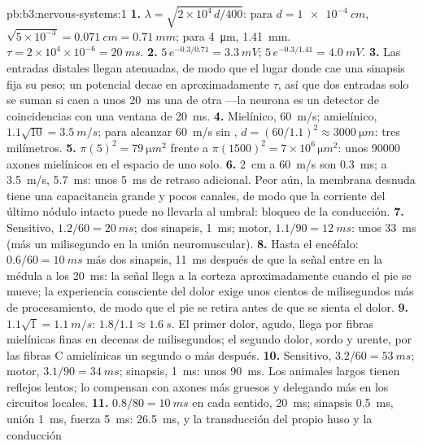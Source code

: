 \begin{solution}{pb:b3:nervous-systems:1}
\textbf{1.} $\lambda = \sqrt{2\times 10^{4}\,d/400}$: para $d =
\qty{1e-4}{cm}$, $\sqrt{5\times 10^{-3}} = \qty{0.071}{cm} =
\qty{0.71}{mm}$; para \qty{4}{\micro m}, \qty{1.41}{mm}. $\tau = 2\times
10^{4}\times 10^{-6} = \qty{20}{ms}$.
\textbf{2.} $5\,e^{-0.3/0.71} = \qty{3.3}{mV}$; $5\,e^{-0.3/1.41} =
\qty{4.0}{mV}$.
\textbf{3.} Las entradas distales llegan atenuadas, de modo que el
lugar donde cae una sinapsis fija su peso; un potencial decae en
aproximadamente $\tau$, así que dos entradas solo se suman si caen a
unos \qty{20}{ms} una de otra ---la neurona es un detector de
coincidencias con una ventana de \qty{20}{ms}.
\textbf{4.} Mielínico, \qty{60}{m/s}; amielínico, $1.1\sqrt{10} =
\qty{3.5}{m/s}$; para alcanzar \qty{60}{m/s} sin , $d = (60/1.1)^{2}
\approx \qty{3000}{\micro m}$: tres milímetros.
\textbf{5.} $\pi(5)^{2} = \qty{79}{\micro m^2}$ frente a $\pi(1500)^{2} =
7\times 10^{6}\,\unit{\micro m^2}$: unos \num{90000} axones mielínicos
en el espacio de uno solo.
\textbf{6.} \qty{2}{cm} a \qty{60}{m/s} son \qty{0.3}{ms}; a
\qty{3.5}{m/s}, \qty{5.7}{ms}: unos \qty{5}{ms} de retraso adicional.
Peor aún, la membrana desnuda tiene una capacitancia grande y pocos
canales, de modo que la corriente del último nódulo intacto puede no
llevarla al umbral: bloqueo de la conducción.
\textbf{7.} Sensitivo, $1.2/60 = \qty{20}{ms}$; dos sinapsis,
\qty{1}{ms}; motor, $1.1/90 = \qty{12}{ms}$: unos \qty{33}{ms} (más un
milisegundo en la unión neuromuscular).
\textbf{8.} Hasta el encéfalo: $0.6/60 = \qty{10}{ms}$ más dos
sinapsis, \qty{11}{ms} después de que la señal entre en la médula a los
\qty{20}{ms}: la señal llega a la corteza aproximadamente cuando el pie
se mueve; la experiencia consciente del dolor exige unos cientos de
milisegundos más de procesamiento, de modo que el pie se retira antes
de que se sienta el dolor.
\textbf{9.} $1.1\sqrt{1} = \qty{1.1}{m/s}$: $1.8/1.1 \approx
\qty{1.6}{s}$. El primer dolor, agudo, llega por fibras mielínicas
finas en decenas de milisegundos; el segundo dolor, sordo y urente, por
las fibras C amielínicas un segundo o más después.
\textbf{10.} Sensitivo, $3.2/60 = \qty{53}{ms}$; motor, $3.1/90 =
\qty{34}{ms}$; sinapsis, \qty{1}{ms}: unos \qty{90}{ms}. Los animales
largos tienen reflejos lentos; lo compensan con axones más gruesos y
delegando más en los circuitos locales.
\textbf{11.} $0.8/80 = \qty{10}{ms}$ en cada sentido, \qty{20}{ms};
sinapsis \qty{0.5}{ms}, unión \qty{1}{ms}, fuerza \qty{5}{ms}:
\qty{26.5}{ms}, y la transducción del propio huso y la conducción

\end{solution}
